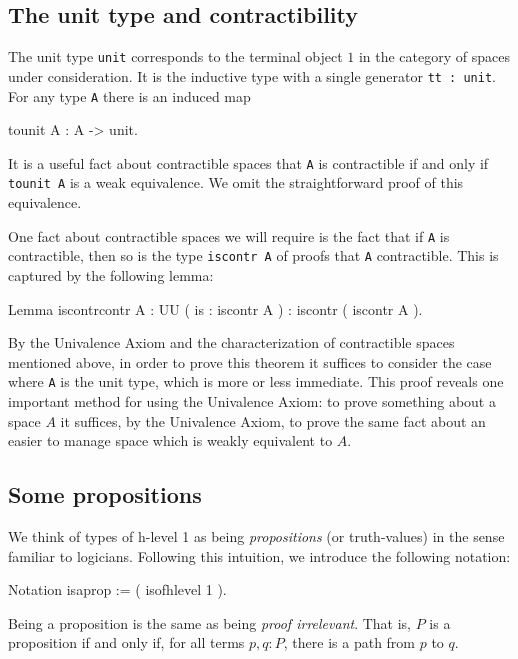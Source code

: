\subsection{The unit type and contractibility}

The unit type \verb|unit| corresponds to the terminal object $1$
in the category of spaces under consideration.  It is the inductive
type with a single generator \verb|tt : unit|.  For any type 
\verb|A| there is an induced map
\begin{center}
  \begin{coqcode}
tounit A : A -> unit.
  \end{coqcode}
\end{center}
It is a useful fact about contractible spaces that \verb|A| is
contractible if and only if \verb|tounit A| is a weak
equivalence.  We omit the straightforward proof of this equivalence.  

One fact about contractible spaces we will require is the fact that if
\verb|A| is contractible, then so is the type 
\verb|iscontr A| of proofs that \verb|A| contractible. This
is captured by the following lemma:
\begin{center}
  \begin{coqcode}
Lemma iscontrcontr { A : UU } ( is : iscontr A ) : 
iscontr ( iscontr A ).    
  \end{coqcode}
\end{center}
By the Univalence Axiom and the characterization of contractible
spaces mentioned above, in order to prove this theorem it suffices to
consider the case where \verb|A| is the unit type, which is
more or less immediate.  This proof reveals one important method for
using the Univalence Axiom: to prove something about a space $A$ it
suffices, by the Univalence Axiom, to prove the same fact about an
easier to manage space which is weakly equivalent to $A$.

\subsection{Some propositions}

We think of types of h-level 1 as being \emph{propositions} (or
truth-values) in the sense familiar to logicians.  Following this
intuition, we introduce the following notation:
\begin{center}
  \begin{coqcode}
Notation isaprop := ( isofhlevel 1 ).
  \end{coqcode}
\end{center}
Being a proposition is the same as being \emph{proof irrelevant}.
That is, $P$ is a proposition if and only if, for all terms $p,q:P$, there is
a path from $p$ to $q$.

